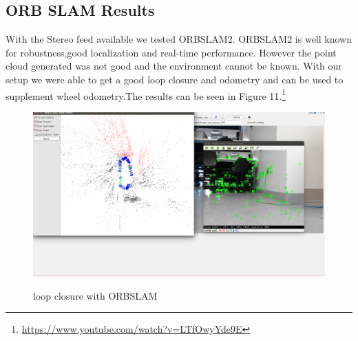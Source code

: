 \documentclass[10pt]{article}
\begin{document}
\subsection{ORB SLAM Results}
	With the Stereo feed available we tested ORBSLAM2. ORBSLAM2 is well known for robustness,good localization and real-time performance. However the point cloud generated was not good and the environment cannot be known. With our setup we were able to get a good loop  closure and odometry and can be used to supplement wheel odometry.The results can be seen in Figure  11.\footnote{\href{https://www.youtube.com/watch?v=LTfOwyYde9E}{https://www.youtube.com/watch?v=LTfOwyYde9E}}
\begin{figure}[H]
\centering \includegraphics[width=1\textwidth]{ORBSLAM.png}\label{ORBSLAM2}
\caption{loop closure with ORBSLAM}
\end{figure}
\end{document}
